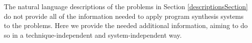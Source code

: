 \documentclass{sig-alternate}
\begin{document}

The natural language descriptions of the problems in Section \ref{descriptionsSection} do not provide all of the information needed to apply program synthesis systems to the problems. Here we provide the needed additional information, aiming to do so in a technique-independent and system-independent way.
\end{document}
